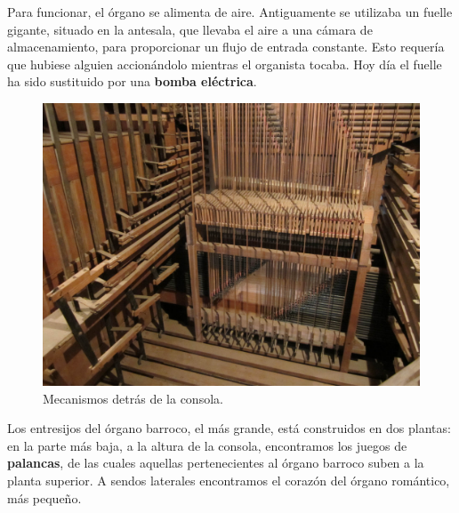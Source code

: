 \smallskip

Para funcionar, el órgano se alimenta de aire. Antiguamente se utilizaba un fuelle gigante, situado en la antesala, que llevaba el aire a una cámara de almacenamiento, para proporcionar un flujo de entrada constante. Esto requería que hubiese alguien accionándolo mientras el organista tocaba. Hoy día el fuelle ha sido sustituido por una \textbf{bomba eléctrica}.

\smallskip

\begin{figure}[H]
	\noindent \begin{centering}
		\includegraphics[width=\linewidth*3/4]{capitulo3/mecanismos}
		\par\end{centering}
	\smallskip
	\caption{\label{fig:mecanismos} Mecanismos detrás de la consola.}
\end{figure} 

\smallskip

Los entresijos del órgano barroco, el más grande, está construidos en dos plantas: en la parte más baja, a la altura de la consola, encontramos los juegos de \textbf{palancas}, de las cuales aquellas pertenecientes al órgano barroco suben a la planta superior. A sendos laterales encontramos el corazón del órgano romántico, más pequeño.

\smallskip


